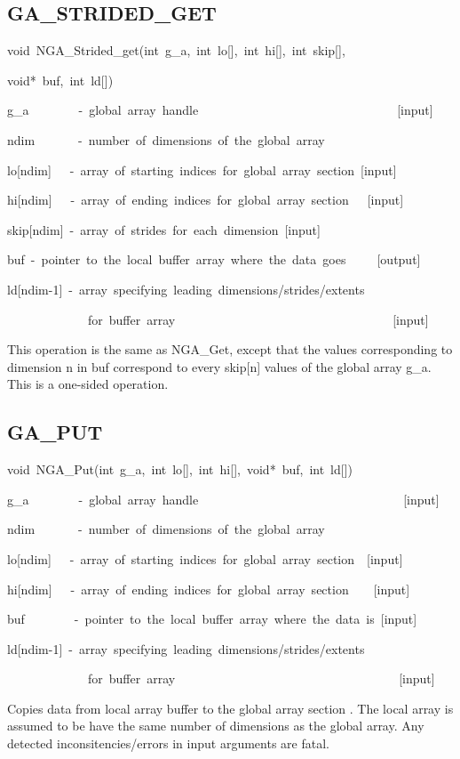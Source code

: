 \subsection*{\label{sub:GA_STRIDED_GET}GA\_STRIDED\_GET}
\begin{lyxcode}
void~NGA\_Strided\_get(int~g\_a,~int~lo{[}{]},~int~hi{[}{]},~int~skip{[}{]},~

void{*}~buf,~int~ld{[}{]})



g\_a~~~~~~~~-~global~array~handle~~~~~~~~~~~~~~~~~~~~~~~~~~~~~~~~{[}input{]}~

ndim~~~~~~~-~number~of~dimensions~of~the~global~array~

lo{[}ndim{]}~~~-~array~of~starting~indices~for~global~array~section~{[}input{]}

hi{[}ndim{]}~~~-~array~of~ending~indices~for~global~array~section~~~{[}input{]}

skip{[}ndim{]}~-~array~of~strides~for~each~dimension~{[}input{]}

buf~-~pointer~to~the~local~buffer~array~where~the~data~goes~~~~~{[}output{]}

ld{[}ndim-1{]}~-~array~specifying~leading~dimensions/strides/extents~

~~~~~~~~~~~~~for~buffer~array~~~~~~~~~~~~~~~~~~~~~~~~~~~~~~~~~~~{[}input{]}
\end{lyxcode}
This operation is the same as NGA\_Get, except that the values corresponding
to dimension n in buf correspond to every skip{[}n{]} values of the
global array g\_a. This is a one-sided operation. 


\subsection*{\label{sub:GA_PUT}GA\_PUT}
\begin{lyxcode}
void~NGA\_Put(int~g\_a,~int~lo{[}{]},~int~hi{[}{]},~void{*}~buf,~int~ld{[}{]})



g\_a~~~~~~~~-~global~array~handle~~~~~~~~~~~~~~~~~~~~~~~~~~~~~~~~~{[}input{]}~

ndim~~~~~~~-~number~of~dimensions~of~the~global~array

lo{[}ndim{]}~~~-~array~of~starting~indices~for~global~array~section~~{[}input{]}

hi{[}ndim{]}~~~-~array~of~ending~indices~for~global~array~section~~~~{[}input{]}

buf~~~~~~~~-~pointer~to~the~local~buffer~array~where~the~data~is~{[}input{]}~

ld{[}ndim-1{]}~-~array~specifying~leading~dimensions/strides/extents~

~~~~~~~~~~~~~for~buffer~array~~~~~~~~~~~~~~~~~~~~~~~~~~~~~~~~~~~~{[}input{]}
\end{lyxcode}
Copies data from local array buffer to the global array section .
The local array is assumed to be have the same number of dimensions
as the global array. Any detected inconsitencies/errors in input arguments
are fatal.

